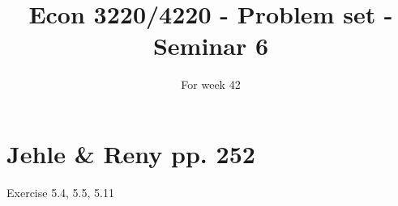 \documentclass{article}
\title{Econ 3220/4220 - Problem set - Seminar 6 }
\date{For week 42}
\begin{document}
\maketitle


\section*{Jehle \& Reny pp. 252}

Exercise 5.4, 5.5, 5.11
\end{document}
